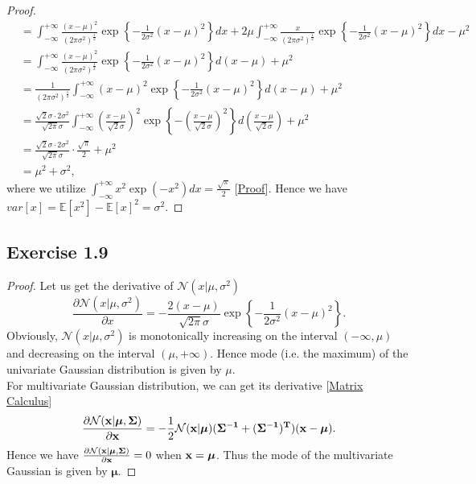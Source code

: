 \documentclass[11pt]{article}
\theoremstyle{definition}
\newcommand{\E}{\mathbb{E}}
\begin{document}
\begin{proof}
\begin{equation*}
\begin{aligned}
&= \int^{+\infty}_{-\infty}\frac{(x-\mu)^2}{(2\pi\sigma^2)^{\frac{1}{2}}}\exp\left\{-\frac{1}{2\sigma^2}\left(x-\mu\right)^2\right\}dx + 2\mu \int^{+\infty}_{-\infty}\frac{x}{(2\pi\sigma^2)^{\frac{1}{2}}}\exp\left\{-\frac{1}{2\sigma^2}\left(x-\mu\right)^2\right\}dx-\mu^2\\
&=\int^{+\infty}_{-\infty}\frac{(x-\mu)^2}{(2\pi\sigma^2)^{\frac{1}{2}}}\exp\left\{-\frac{1}{2\sigma^2}\left(x-\mu\right)^2\right\}d(x-\mu) + \mu^2\\
&= \frac{1}{(2\pi\sigma^2)^{\frac{1}{2}}}\int^{+\infty}_{-\infty}(x-\mu)^2\exp\left\{-\frac{1}{2\sigma^2}\left(x-\mu\right)^2\right\}d(x-\mu) + \mu^2\\
&= \frac{\sqrt{2}\sigma \cdot 2\sigma^2}{\sqrt{2\pi}\sigma}\int^{+\infty}_{-\infty}\left(\frac{x-\mu}{\sqrt{2}\sigma}\right)^2\exp\left\{-\left(\frac{x-\mu}{\sqrt{2}\sigma}\right)^2\right\}d\left(\frac{x-\mu}{\sqrt{2}\sigma}\right) + \mu^2\\
&= \frac{\sqrt{2}\sigma \cdot 2\sigma^2}{\sqrt{2\pi}\sigma} \cdot \frac{\sqrt{\pi}}{2} + \mu^2\\
&= \mu^2 + \sigma^2,
\end{aligned}
\end{equation*}
where we utilize $\int^{+\infty}_{-\infty}x^2\exp(-x^2)dx = \frac{\sqrt{\pi}}{2}$ [\href{https://math.stackexchange.com/questions/66084/integral-int-infty-infty-x2-e-x2-mathrm-dx}{Proof}]. Hence we have $var[x] = \E[x^2] - \E[x]^2 = \sigma^2$.
\end{proof}

\subsection{Exercise 1.9}
\begin{proof}
Let us get the derivative of $\mathcal{N}(x|\mu, \sigma^2)$
\begin{equation*}
\frac{\partial\mathcal{N}(x|\mu, \sigma^2)}{\partial x} =  -\frac{2(x-\mu)}{\sqrt{2\pi}\sigma}\exp\left\{-\frac{1}{2\sigma^2}\left(x-\mu\right)^2\right\}.
\end{equation*}
Obviously, $\mathcal{N}(x|\mu, \sigma^2)$ is monotonically increasing on the interval $(-\infty, \mu)$ and decreasing on the interval $(\mu, +\infty)$. Hence mode (i.e. the maximum) of the univariate Gaussian distribution is given by $\mu$.\\
For multivariate Gaussian distribution, we can get its derivative [\href{https://www.matrixcalculus.org/}{Matrix Calculus}]
\begin{equation*}
\frac{\partial\mathcal{N}(\bf x|\boldsymbol{\mu}, \bf\Sigma)}{\partial \bf x} = -\frac{1}{2}\mathcal{N}(\bf x|\boldsymbol{\mu})(\bf \Sigma^{-1} + (\bf {\Sigma^{-1}})^{T})(\bf x - \boldsymbol{\mu}).
\end{equation*}
Hence we have $\frac{\partial\mathcal{N}(\bf x|\boldsymbol{\mu}, \bf\Sigma)}{\partial \bf x} = 0$ when $\bf x = \boldsymbol{\mu}$. Thus the mode of the multivariate Gaussian is given by $\boldsymbol{\mu}$.
\end{proof}
\end{document}
